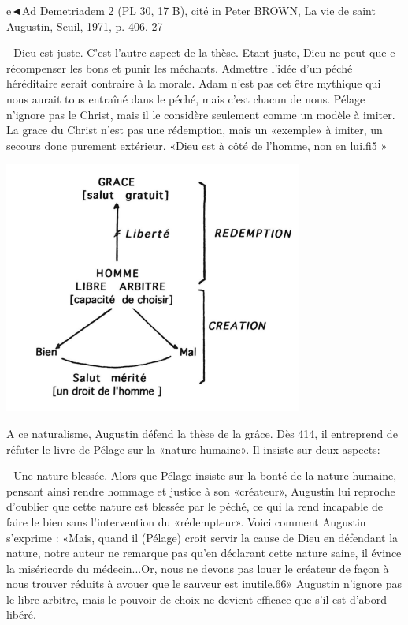 e◄Ad Demetriadem 2 (PL 30, 17 B), cité in Peter BROWN, La vie de saint Augustin, Seuil, 1971, p.
406.
27
 
- Dieu est	juste. C'est l'autre aspect de la thèse. Etant juste, Dieu ne peut que	e
récompenser les bons et punir les méchants. Admettre l'idée d'un péché héréditaire
serait contraire à la morale. Adam n'est pas cet être mythique qui nous aurait tous entraîné dans le péché, mais c'est chacun de nous. Pélage n'ignore pas le Christ, mais il le considère seulement comme un modèle à imiter. La grace du Christ n'est pas une rédemption, mais un «exemple» à imiter,  un secours donc purement extérieur.
«Dieu est à côté de l'homme, non en lui.fi5 »



 \includegraphics[width=\textwidth]{CoursTheo/Images/Augustin - Redemption.png}






A ce naturalisme, Augustin défend la thèse de la grâce. Dès 414, il entreprend de réfuter le livre de Pélage sur la «nature humaine». Il insiste sur deux aspects:

-	Une		nature	blessée.	Alors que Pélage insiste sur la bonté de la nature humaine, pensant ainsi rendre hommage et justice à son «créateur», Augustin lui reproche d'oublier que cette nature est blessée par le péché, ce qui la rend incapable de faire le bien sans l'intervention du «rédempteur».		Voici comment Augustin s'exprime :	«Mais, quand il (Pélage) croit servir la cause de Dieu en défendant la nature, notre auteur ne remarque pas qu'en déclarant cette nature saine, il évince la miséricorde du médecin...Or, nous ne devons pas louer le créateur de façon à nous trouver réduits à avouer que le sauveur est inutile.66»	Augustin n'ignore pas le libre arbitre, mais le pouvoir de choix ne devient efficace que s'il est d'abord libéré.

